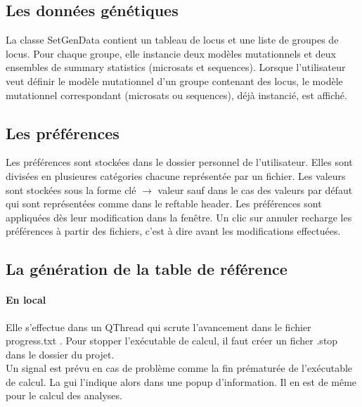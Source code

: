 \documentclass[12pt,a4paper]{article}
\begin{document}
    \subsection{Les données génétiques}
        La classe SetGenData contient un tableau de locus et une liste de
        groupes de locus. Pour chaque groupe, elle instancie deux modèles
        mutationnels et deux ensembles de summary statistics (microsats et
        sequences). Lorsque l'utilisateur veut définir le modèle mutationnel
        d'un groupe contenant des locus, le modèle mutationnel correspondant
        (microsats ou sequences), déjà instancié, est affiché.

    \subsection{Les préférences}
        Les préférences sont stockées dans le dossier personnel de
        l'utilisateur. Elles sont divisées en plusieures catégories chacune
        représentée par un fichier. Les valeurs sont stockées sous la forme clé
        $\rightarrow$ valeur sauf dans le cas des valeurs par défaut qui sont
        représentées comme dans le reftable header. Les préférences sont
        appliquées dès leur modification dans la fenêtre. Un clic sur annuler
        recharge les préférences à partir des fichiers, c'est à dire avant les
        modifications effectuées.
        

    \subsection{La génération de la table de référence}
        \paragraph{En local}
        Elle s'effectue dans un QThread qui scrute l'avancement dans le fichier
        progress.txt . Pour stopper l'exécutable de calcul, il faut créer un
        ficher .stop dans le dossier du projet.\\

        Un signal est prévu en cas de problème comme la fin prématurée de
        l'exécutable de calcul. La gui l'indique alors dans une popup
        d'information.  Il en est de même pour le calcul des analyses.
\end{document}

